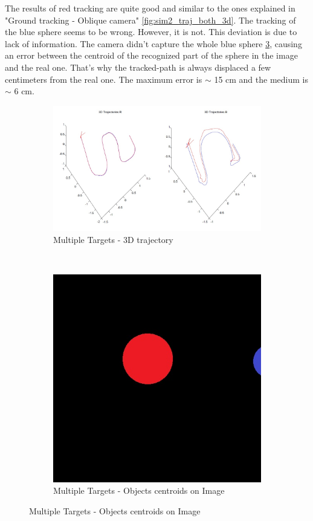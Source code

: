	The results of red tracking are quite good and similar to the ones explained in "Ground tracking - Oblique camera" \ref{fig:sim2_traj_both_3d}. The tracking of the blue sphere seems to be wrong. However, it is not. This deviation is due to lack of information. The camera didn't capture the whole blue sphere \ref{fig:sim4_centroid_objs}, causing an error between the centroid of the recognized part of the sphere in the image and the real one. That's why the tracked-path is always displaced a few centimeters from the real one. The maximum error is $\sim$ 15 cm and the medium is $\sim$ 6 cm.



\begin{figure}[hp]
	\centering
	\begin{subfigure}{0.45\linewidth}
		\centering
		\includegraphics[width=\linewidth]{../Images/c3/sim4_3dtraj}
		\caption{Multiple Targets - 3D trajectory}
		\label{fig:sim4_3dtraj}
	\end{subfigure}
	~
	\begin{subfigure}{0.2\linewidth}
		\centering
		\includegraphics[width=\linewidth]{../Images/c3/sims_two_object_centroid_out}
		\caption{Multiple Targets - Objects centroids on Image}
		\label{fig:sim4_centroid_objs}
	\end{subfigure}
\end{figure}